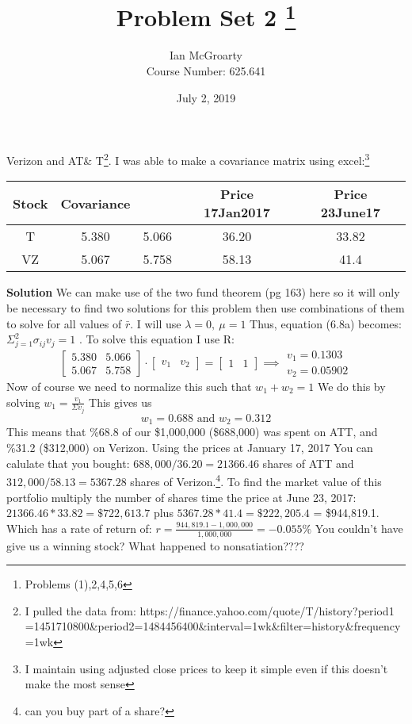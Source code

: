 \documentclass[12pt]{article}
\title{Problem Set 2 \thanks{Problems (1),2,4,5,6}}
\author{Ian McGroarty \\
	Course Number: 625.641}
\date{July 2, 2019}
\newenvironment{problem}[3][Problem]{\begin{trivlist}
\item[\hskip \labelsep {\bfseries #1}\hskip \labelsep {\bfseries #2.}]}{\end{trivlist}}
\begin{document}
\maketitle
\newpage
\begin{problem}1. Verizon and AT\& T\footnote{I pulled the data from: https://finance.yahoo.com/quote/T/history?period1
=1451710800\&period2=1484456400\&interval=1wk\&filter=history\&frequency=1wk}. I was able to make a covariance matrix using excel:\footnote{I maintain using adjusted close prices to keep it simple even if this doesn't make the most sense} 
\begin{center}
\begin{tabular}{c|cc|cc}
\hline
Stock & Covariance & &Price 17Jan2017 &Price 23June17\\ 
\hline
T & 5.380 & 5.066 & 36.20 &33.82\\
VZ & 5.067 & 5.758 & 58.13 & 41.4
\end{tabular}
\end{center}
\textbf{Solution} We can make use of the two fund theorem (pg 163) here so it will only be necessary to find two solutions for this problem then use combinations of them to solve for all values of $\bar{r}$. I will use $\lambda = 0, \ \mu = 1$ Thus, equation (6.8a) becomes: $ \Sigma_{j=1}^2 \sigma_{ij} v_j = 1 $ .  To solve this equation I use R: 
$$
\begin{bmatrix}
 5.380 & 5.066 \\
 5.067 & 5.758
\end{bmatrix}
\cdot
\begin{bmatrix} v_1 & v_2 \end{bmatrix}
=
\begin{bmatrix} 1 & 1 \end{bmatrix}
\implies
\begin{matrix} v_1 = 0.1303 \\ v_2 = 0.05902 \end{matrix}
$$
 Now of course we need to normalize this such that $w_1 + w_2 = 1$ We do this by solving $ w_1 = \frac{v_1}{\Sigma v_j}$ This gives us $$w_1 = 0.688 \text{ and } w_2 =0.312$$  This means that \%68.8 of our \$1,000,000 (\$688,000) was spent on ATT, and \%31.2 (\$312,000) on Verizon. Using the prices at January 17, 2017 You can calulate that you bought: $688,000/36.20 = 21366.46$ shares of ATT and $312,000/58.13 = 5367.28$ shares of Verizon.\footnote{can you buy part of a share?}. To find the market value of this portfolio multiply the number of shares time the price at June 23, 2017: $ 21366.46*33.82 =\$722,613.7$ plus $  5367.28*41.4 =\$222,205.4$ = \$944,819.1. Which has a rate of return of: $r = \frac{944,819.1-1,000,000}{1,000,000} = -0.055\% $ You couldn't have give us a winning stock? What happened to nonsatiation????
 
 \end{problem}
 
\end{document}
